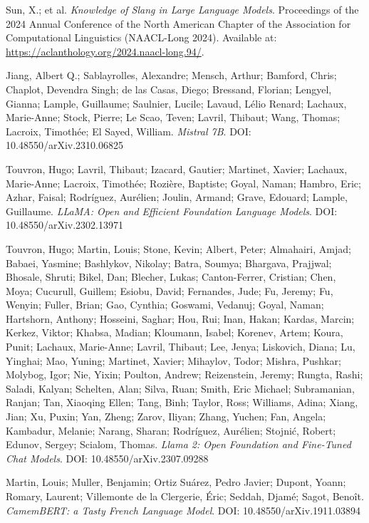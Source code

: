 \documentclass[12pt]{article}
\begin{document}
\begin{thebibliography}{9}
Sun, X.; et al.
\textit{Knowledge of Slang in Large Language Models}.
Proceedings of the 2024 Annual Conference of the North American Chapter of the Association for Computational Linguistics (NAACL-Long 2024).
Available at: \url{https://aclanthology.org/2024.naacl-long.94/}.

Jiang, Albert Q.; Sablayrolles, Alexandre; Mensch, Arthur; Bamford, Chris; Chaplot, Devendra Singh; de las Casas, Diego; Bressand, Florian; Lengyel, Gianna; Lample, Guillaume; Saulnier, Lucile; Lavaud, Lélio Renard; Lachaux, Marie-Anne; Stock, Pierre; Le Scao, Teven; Lavril, Thibaut; Wang, Thomas; Lacroix, Timothée; El Sayed, William.
\textit{Mistral 7B}.
DOI: 10.48550/arXiv.2310.06825

Touvron, Hugo; Lavril, Thibaut; Izacard, Gautier; Martinet, Xavier; Lachaux, Marie-Anne; Lacroix, Timothée; Rozière, Baptiste; Goyal, Naman; Hambro, Eric; Azhar, Faisal; Rodríguez, Aurélien; Joulin, Armand; Grave, Edouard; Lample, Guillaume.  
\textit{LLaMA: Open and Efficient Foundation Language Models}.  
DOI: 10.48550/arXiv.2302.13971  

Touvron, Hugo; Martin, Louis; Stone, Kevin; Albert, Peter; Almahairi, Amjad; Babaei, Yasmine; Bashlykov, Nikolay; Batra, Soumya; Bhargava, Prajjwal; Bhosale, Shruti; Bikel, Dan; Blecher, Lukas; Canton-Ferrer, Cristian; Chen, Moya; Cucurull, Guillem; Esiobu, David; Fernandes, Jude; Fu, Jeremy; Fu, Wenyin; Fuller, Brian; Gao, Cynthia; Goswami, Vedanuj; Goyal, Naman; Hartshorn, Anthony; Hosseini, Saghar; Hou, Rui; Inan, Hakan; Kardas, Marcin; Kerkez, Viktor; Khabsa, Madian; Kloumann, Isabel; Korenev, Artem; Koura, Punit; Lachaux, Marie-Anne; Lavril, Thibaut; Lee, Jenya; Liskovich, Diana; Lu, Yinghai; Mao, Yuning; Martinet, Xavier; Mihaylov, Todor; Mishra, Pushkar; Molybog, Igor; Nie, Yixin; Poulton, Andrew; Reizenstein, Jeremy; Rungta, Rashi; Saladi, Kalyan; Schelten, Alan; Silva, Ruan; Smith, Eric Michael; Subramanian, Ranjan; Tan, Xiaoqing Ellen; Tang, Binh; Taylor, Ross; Williams, Adina; Xiang, Jian; Xu, Puxin; Yan, Zheng; Zarov, Iliyan; Zhang, Yuchen; Fan, Angela; Kambadur, Melanie; Narang, Sharan; Rodríguez, Aurélien; Stojnić, Robert; Edunov, Sergey; Scialom, Thomas.  
\textit{Llama 2: Open Foundation and Fine-Tuned Chat Models}.  
DOI: 10.48550/arXiv.2307.09288  

Martin, Louis; Muller, Benjamin; Ortiz Suárez, Pedro Javier; Dupont, Yoann; Romary, Laurent; Villemonte de la Clergerie, Éric; Seddah, Djamé; Sagot, Benoît.  
\textit{CamemBERT: a Tasty French Language Model}.  
DOI: 10.48550/arXiv.1911.03894  


\end{thebibliography}
\end{document}
